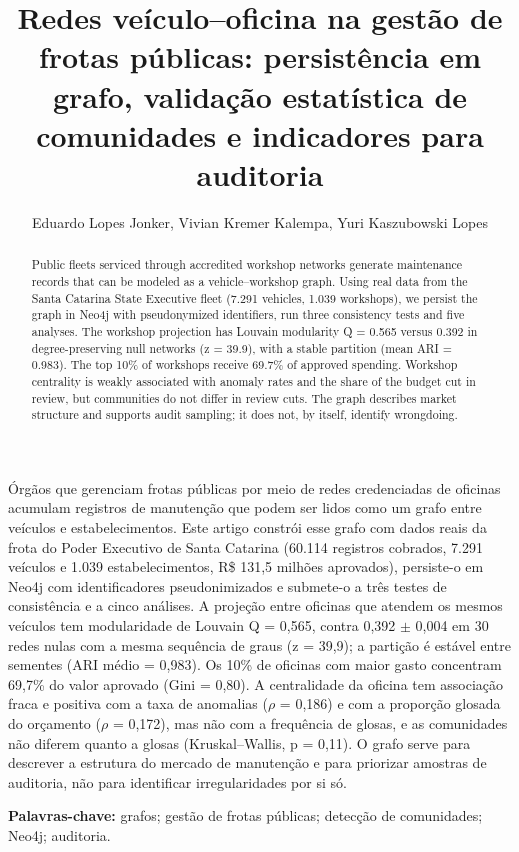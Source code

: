 \documentclass[12pt,a4paper]{article}
\title{Redes veículo–oficina na gestão de frotas públicas: persistência em grafo, validação estatística de comunidades e indicadores para auditoria}
\author{Eduardo Lopes Jonker\inst{1}, Vivian Kremer Kalempa\inst{1}, Yuri Kaszubowski Lopes\inst{1}}
\begin{document}
\maketitle

\begin{abstract}
Public fleets serviced through accredited workshop networks generate maintenance records that can be modeled as a vehicle–workshop graph. Using real data from the Santa Catarina State Executive fleet (7.291 vehicles, 1.039 workshops), we persist the graph in Neo4j with pseudonymized identifiers, run three consistency tests and five analyses. The workshop projection has Louvain modularity Q = 0.565 versus 0.392 in degree-preserving null networks (z = 39.9), with a stable partition (mean ARI = 0.983). The top 10\% of workshops receive 69.7\% of approved spending. Workshop centrality is weakly associated with anomaly rates and the share of the budget cut in review, but communities do not differ in review cuts. The graph describes market structure and supports audit sampling; it does not, by itself, identify wrongdoing.
\end{abstract}

\begin{resumo}
Órgãos que gerenciam frotas públicas por meio de redes credenciadas de oficinas acumulam registros de manutenção que podem ser lidos como um grafo entre veículos e estabelecimentos. Este artigo constrói esse grafo com dados reais da frota do Poder Executivo de Santa Catarina (60.114 registros cobrados, 7.291 veículos e 1.039 estabelecimentos, R\$ 131,5 milhões aprovados), persiste-o em Neo4j com identificadores pseudonimizados e submete-o a três testes de consistência e a cinco análises. A projeção entre oficinas que atendem os mesmos veículos tem modularidade de Louvain Q = 0,565, contra 0,392 $\pm$ 0,004 em 30 redes nulas com a mesma sequência de graus (z = 39,9); a partição é estável entre sementes (ARI médio = 0,983). Os 10\% de oficinas com maior gasto concentram 69,7\% do valor aprovado (Gini = 0,80). A centralidade da oficina tem associação fraca e positiva com a taxa de anomalias ($\rho$ = 0,186) e com a proporção glosada do orçamento ($\rho$ = 0,172), mas não com a frequência de glosas, e as comunidades não diferem quanto a glosas (Kruskal–Wallis, p = 0,11). O grafo serve para descrever a estrutura do mercado de manutenção e para priorizar amostras de auditoria, não para identificar irregularidades por si só.

\noindent\textbf{Palavras-chave:} grafos; gestão de frotas públicas; detecção de comunidades; Neo4j; auditoria.
\end{resumo}
\end{document}

